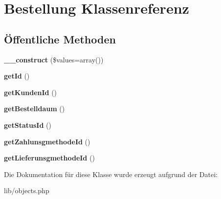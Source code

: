 \hypertarget{classBestellung}{\section{\-Bestellung \-Klassenreferenz}
\label{classBestellung}
}
\subsection*{Öffentliche \-Methoden}
\begin{DoxyCompactItemize}
\item 
\hypertarget{classBestellung_a2a2fb909389e1336f8cb87a2a3126c39}{{\bfseries \-\_\-\-\_\-construct} (\$values=array())}\label{classBestellung_a2a2fb909389e1336f8cb87a2a3126c39}

\item 
\hypertarget{classBestellung_ac433ecde97ce5cd8d0b7fc1884af9c87}{{\bfseries get\-Id} ()}\label{classBestellung_ac433ecde97ce5cd8d0b7fc1884af9c87}

\item 
\hypertarget{classBestellung_a3be08a9bfeca49713a00f76585b5a7ce}{{\bfseries get\-Kunden\-Id} ()}\label{classBestellung_a3be08a9bfeca49713a00f76585b5a7ce}

\item 
\hypertarget{classBestellung_aef3ff01fd39f0249c8bc379695f95db6}{{\bfseries get\-Bestelldaum} ()}\label{classBestellung_aef3ff01fd39f0249c8bc379695f95db6}

\item 
\hypertarget{classBestellung_a2231a535ab51190d52fd5a89843109e8}{{\bfseries get\-Status\-Id} ()}\label{classBestellung_a2231a535ab51190d52fd5a89843109e8}

\item 
\hypertarget{classBestellung_af3cac1bf22f8c5fb882bde3fc11ae3b1}{{\bfseries get\-Zahlunsgmethode\-Id} ()}\label{classBestellung_af3cac1bf22f8c5fb882bde3fc11ae3b1}

\item 
\hypertarget{classBestellung_a7a11cefdae3ace84e9eb09bd5afe31e8}{{\bfseries get\-Lieferunsgmethode\-Id} ()}\label{classBestellung_a7a11cefdae3ace84e9eb09bd5afe31e8}

\end{DoxyCompactItemize}


\-Die \-Dokumentation für diese \-Klasse wurde erzeugt aufgrund der \-Datei\-:\begin{DoxyCompactItemize}
\item 
lib/objects.\-php\end{DoxyCompactItemize}
